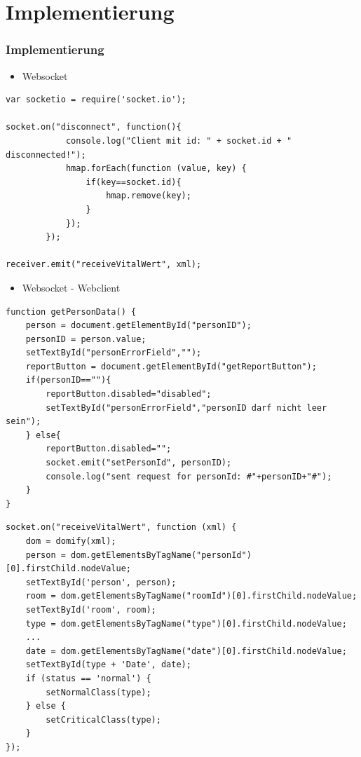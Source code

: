 \documentclass{beamer}
\begin{document}
\section{Implementierung}

\begin{frame}[fragile]
\frametitle{Implementierung}
\begin{itemize}
	\item Websocket
\end{itemize}
\begin{lstlisting}
var socketio = require('socket.io');

socket.on("disconnect", function(){
            console.log("Client mit id: " + socket.id + " disconnected!");
            hmap.forEach(function (value, key) {
                if(key==socket.id){
                    hmap.remove(key);
                }
            });
        });
        
receiver.emit("receiveVitalWert", xml);
\end{lstlisting}
\end{frame}

\begin{frame}[fragile]
\begin{itemize}
	\item Websocket - Webclient
\end{itemize}
\begin{lstlisting}
function getPersonData() {
    person = document.getElementById("personID");
    personID = person.value;
    setTextById("personErrorField","");
    reportButton = document.getElementById("getReportButton");
    if(personID==""){
        reportButton.disabled="disabled";
        setTextById("personErrorField","personID darf nicht leer sein");
    } else{
        reportButton.disabled="";
        socket.emit("setPersonId", personID);
        console.log("sent request for personId: #"+personID+"#");    
    }
}
\end{lstlisting}
\end{frame}

\begin{frame}[fragile]
\begin{lstlisting}
socket.on("receiveVitalWert", function (xml) {
    dom = domify(xml);
    person = dom.getElementsByTagName("personId")[0].firstChild.nodeValue;
    setTextById('person', person);
    room = dom.getElementsByTagName("roomId")[0].firstChild.nodeValue;
    setTextById('room', room);
    type = dom.getElementsByTagName("type")[0].firstChild.nodeValue;
    ...
    date = dom.getElementsByTagName("date")[0].firstChild.nodeValue;
    setTextById(type + 'Date', date);
    if (status == 'normal') {
        setNormalClass(type);
    } else {
        setCriticalClass(type);
    }
});
\end{lstlisting}
\end{frame}
\end{document}
